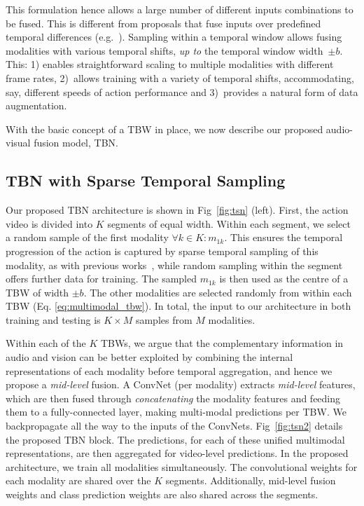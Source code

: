 \documentclass[10pt,twocolumn,letterpaper]{article}
\begin{document}
\noindent This formulation hence allows a large number of different inputs combinations to be fused. 
This is different from proposals that fuse inputs over predefined temporal differences (e.g.~\cite{async_fusion}). Sampling within a temporal window allows fusing modalities with various temporal shifts, \textit{up to} the temporal window width~$\pm b$. This: 1) enables straightforward scaling to multiple modalities with different frame rates, 2)~allows training with a variety of temporal shifts, accommodating, say, different speeds of action performance and 3)~provides a natural form of data augmentation.

With the basic concept of a TBW in place, we now describe our proposed audio-visual fusion model, TBN. 




\subsection{TBN with Sparse Temporal Sampling}
\label{sec:method:arch}
Our proposed TBN architecture is shown in Fig~\ref{fig:tsn} (left).
First, the action video is divided into $K$ segments of equal width.
Within each segment, we select a random sample of the first modality $\forall k \in K: m_{1k}$.
This ensures the temporal progression of the action is captured by sparse temporal sampling of this modality, as with previous works~\cite{TSN2016ECCV,Zhou_2018_ECCV}, while random sampling within the segment offers further data for training.
The sampled $m_{1k}$ is then used as the centre of a TBW of width $\pm b$.
The other modalities are selected randomly from within each TBW (Eq. \ref{eq:multimodal_tbw}).
In total, the input to our architecture in both training and testing is $K \times M$ samples from $M$ modalities.

Within each of the $K$ TBWs, we argue that the complementary information in audio and vision can be better exploited by combining the internal representations
of each modality before temporal aggregation, and hence we propose a \textit{mid-level} fusion. A ConvNet (per modality) extracts \textit{mid-level} features, which are then fused 
through
\textit{concatenating} the modality features and feeding them to a fully-connected layer, making multi-modal predictions per TBW. 
We backpropagate all the way to the inputs of the ConvNets.
Fig~\ref{fig:tsn2} details the proposed TBN block.
The predictions, for each of these unified multimodal representations, are then aggregated for video-level predictions.
In the proposed architecture, we train all modalities simultaneously. 
The convolutional weights for each modality are shared over the $K$ segments. 
Additionally, mid-level fusion weights and class prediction weights are also shared across the segments.
\end{document}
